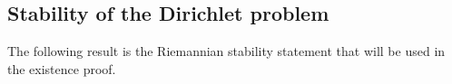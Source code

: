 \documentclass{article}
\renewcommand{\boxed}[1]{#1}
\newtheorem{theorem}{Theorem}[section]
\newenvironment{proof}[1][Proof]{\textbf{#1.} }{\ \rule{0.5em}{0.5em}}
\begin{document}
\subsection{Stability of the Dirichlet problem}
\label{subsec:stability-dirichlet}

The following result is the Riemannian stability statement that will be
used in the existence proof.

\end{document}
